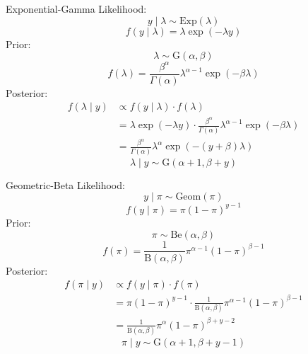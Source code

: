 \documentclass{article}\usepackage[]{graphicx}\usepackage[]{xcolor}
\begin{document}
\begin{multicols*}{2}
Exponential-Gamma
Likelihood:
\begin{equation*}
    y\mid\lambda \sim \text{Exp}(\lambda)
\end{equation*}
\begin{equation*}
    f(y\mid\lambda)=\lambda \exp(-\lambda y)
\end{equation*}
Prior:
\begin{equation*}
    \lambda \sim \text{G}(\alpha,\beta)
\end{equation*}
\begin{equation*}
    f(\lambda)=\frac{\beta^{\alpha}}{\Gamma(\alpha)}\lambda^{\alpha-1}\exp(-\beta\lambda)
\end{equation*}
Posterior:
\begin{align*}
    f(\lambda\mid y)&\propto f(y\mid\lambda)\cdot f(\lambda) \\
    &=\lambda \exp(-\lambda y)\cdot \frac{\beta^{\alpha}}{\Gamma(\alpha)}\lambda^{\alpha-1}\exp(-\beta\lambda) \\
    &=\frac{\beta^{\alpha}}{\Gamma(\alpha)}\lambda^{\alpha}\exp(-(y+\beta)\lambda) 
\end{align*}
\begin{equation*}
    \lambda\mid y\sim \text{G}(\alpha+1, \beta+y)
\end{equation*}


Geometric-Beta
Likelihood:
\begin{equation*}
    y\mid\pi \sim \text{Geom}(\pi)
\end{equation*}
\begin{equation*}
    f(y\mid\pi)=\pi(1-\pi)^{y-1}
\end{equation*}
Prior:
\begin{equation*}
    \pi \sim \text{Be}(\alpha,\beta)
\end{equation*}
\begin{equation*}
    f(\pi)=\frac{1}{\text{B}(\alpha,\beta)}\pi^{\alpha-1}(1-\pi)^{\beta-1}
\end{equation*}
Posterior:
\begin{align*}
    f(\pi\mid y)&\propto f(y\mid\pi)\cdot f(\pi) \\
    &=\pi(1-\pi)^{y-1}\cdot \frac{1}{\text{B}(\alpha,\beta)}\pi^{\alpha-1}(1-\pi)^{\beta-1} \\
    &=\frac{1}{\text{B}(\alpha,\beta)}\pi^{\alpha}(1-\pi)^{\beta+y-2}
\end{align*}
\begin{equation*}
    \pi\mid y\sim \text{G}(\alpha+1, \beta+y-1)
\end{equation*}


\end{multicols*}
\end{document}
